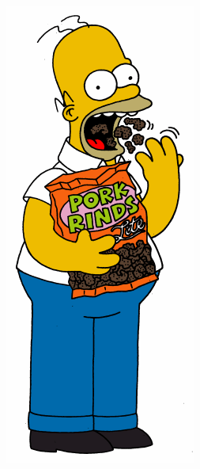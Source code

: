 \documentclass[paper=a4, fontsize=11pt]{scrartcl} %
\numberwithin{equation}{section} %
\numberwithin{figure}{section} %
\numberwithin{table}{section} %
\begin{document}
\begin{figure}
\begin{subfigure}[b]{0.15\textwidth}
        \includegraphics[width=\textwidth]{homer001}

\end{subfigure}
\end{figure}
\end{document}
